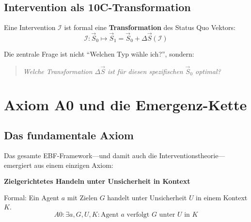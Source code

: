 \subsection{Intervention als 10C-Transformation}
\label{sec:17-transform}

Eine Intervention $\mathcal{I}$ ist formal eine \textbf{Transformation} des Status Quo Vektors:
\begin{equation}
\boxed{\mathcal{I}: \vec{S}_0 \mapsto \vec{S}_1 = \vec{S}_0 + \Delta\vec{S}(\mathcal{I})}
\label{eq:17-intervention-transform}
\end{equation}

Die zentrale Frage ist nicht ``Welchen Typ w\"{a}hle ich?'', sondern:
\begin{quote}
\textit{Welche Transformation $\Delta\vec{S}$ ist f\"{u}r diesen spezifischen $\vec{S}_0$ optimal?}
\end{quote}



\section{Axiom A0 und die Emergenz-Kette}
\label{sec:17-axiom}

\subsection{Das fundamentale Axiom}
\label{sec:17-a0}

Das gesamte EBF-Framework---und damit auch die Interventionstheorie---emergiert aus einem einzigen Axiom:

\begin{tcolorbox}[colback=purple!5!white, colframe=purple!75!black,
    title=\textbf{Axiom A0: Das Fundament}]
\begin{center}
\Large
\textbf{Zielgerichtetes Handeln unter Unsicherheit in Kontext}
\end{center}

\vspace{0.3cm}
Formal: Ein Agent $a$ mit Zielen $G$ handelt unter Unsicherheit $U$ in einem Kontext $K$.
\begin{equation}
\boxed{A0: \exists a, G, U, K: \text{Agent } a \text{ verfolgt } G \text{ unter } U \text{ in } K}
\label{eq:17-axiom-a0}
\end{equation}
\end{tcolorbox}

